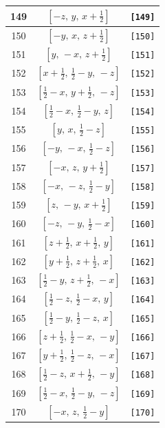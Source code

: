 \documentclass[fleqn,8pt]{jsarticle}
\begin{document}
\begin{longtable}{ccc}
149 & $\left[ - z,\, y,\, x + \frac{1}{2} \right]$ & {\tt [149]} \\ \hline
150 & $\left[ - y,\, x,\, z + \frac{1}{2} \right]$ & {\tt [150]} \\ \hline
151 & $\left[ y,\, - x,\, z + \frac{1}{2} \right]$ & {\tt [151]} \\ \hline
152 & $\left[ x + \frac{1}{2},\, \frac{1}{2} - y,\, - z \right]$ & {\tt [152]} \\ \hline
153 & $\left[ \frac{1}{2} - x,\, y + \frac{1}{2},\, - z \right]$ & {\tt [153]} \\ \hline
154 & $\left[ \frac{1}{2} - x,\, \frac{1}{2} - y,\, z \right]$ & {\tt [154]} \\ \hline
155 & $\left[ y,\, x,\, \frac{1}{2} - z \right]$ & {\tt [155]} \\ \hline
156 & $\left[ - y,\, - x,\, \frac{1}{2} - z \right]$ & {\tt [156]} \\ \hline
157 & $\left[ - x,\, z,\, y + \frac{1}{2} \right]$ & {\tt [157]} \\ \hline
158 & $\left[ - x,\, - z,\, \frac{1}{2} - y \right]$ & {\tt [158]} \\ \hline
159 & $\left[ z,\, - y,\, x + \frac{1}{2} \right]$ & {\tt [159]} \\ \hline
160 & $\left[ - z,\, - y,\, \frac{1}{2} - x \right]$ & {\tt [160]} \\ \hline
161 & $\left[ z + \frac{1}{2},\, x + \frac{1}{2},\, y \right]$ & {\tt [161]} \\ \hline
162 & $\left[ y + \frac{1}{2},\, z + \frac{1}{2},\, x \right]$ & {\tt [162]} \\ \hline
163 & $\left[ \frac{1}{2} - y,\, z + \frac{1}{2},\, - x \right]$ & {\tt [163]} \\ \hline
164 & $\left[ \frac{1}{2} - z,\, \frac{1}{2} - x,\, y \right]$ & {\tt [164]} \\ \hline
165 & $\left[ \frac{1}{2} - y,\, \frac{1}{2} - z,\, x \right]$ & {\tt [165]} \\ \hline
166 & $\left[ z + \frac{1}{2},\, \frac{1}{2} - x,\, - y \right]$ & {\tt [166]} \\ \hline
167 & $\left[ y + \frac{1}{2},\, \frac{1}{2} - z,\, - x \right]$ & {\tt [167]} \\ \hline
168 & $\left[ \frac{1}{2} - z,\, x + \frac{1}{2},\, - y \right]$ & {\tt [168]} \\ \hline
169 & $\left[ \frac{1}{2} - x,\, \frac{1}{2} - y,\, - z \right]$ & {\tt [169]} \\ \hline
170 & $\left[ - x,\, z,\, \frac{1}{2} - y \right]$ & {\tt [170]} \\ \hline

\end{longtable}
\end{document}
